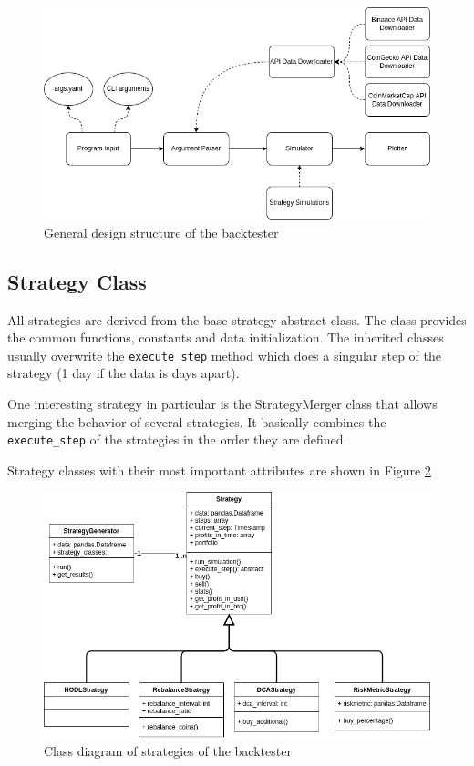 \begin{figure}[!hbt]
    \centering
    \includegraphics[width=\columnwidth]{figures/structure-diagram.png}
    \caption{General design structure of the backtester}
    \label{structure-diagram}
\end{figure}

\subsection*{Strategy Class}
All strategies are derived from the base strategy abstract class. The class provides the common functions, constants and data initialization. The inherited classes usually overwrite the \texttt{execute\_step} method which does a singular step of the strategy (1 day if the data is days apart).

One interesting strategy in particular is the StrategyMerger class that allows merging the behavior of several strategies. It basically combines the \texttt{execute\_step} of the strategies in the order they are defined.

Strategy classes with their most important attributes are shown in Figure \ref{figure-strategy-class-diagram}

\begin{figure}[!hbt]
    \centering
    \includegraphics[width=\columnwidth]{figures/strategy-class-diagram.png}
    \caption{Class diagram of strategies of the backtester}
    \label{figure-strategy-class-diagram}
\end{figure}


